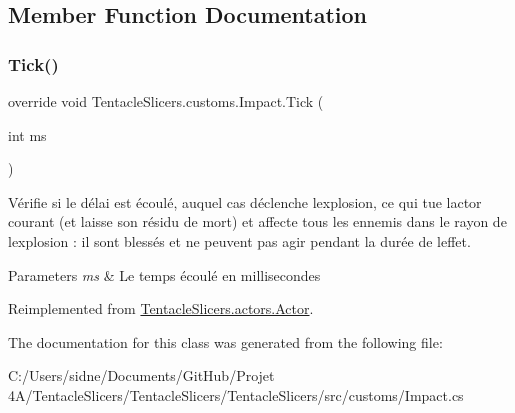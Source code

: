 \subsection{Member Function Documentation}
\mbox{\label{class_tentacle_slicers_1_1customs_1_1_impact_ad9ed6b3562b6063e567638058787fd6f}} 
\subsubsection{\texorpdfstring{Tick()}{Tick()}}
{\footnotesize\ttfamily override void Tentacle\+Slicers.\+customs.\+Impact.\+Tick (\begin{DoxyParamCaption}\item[{int}]{ms }\end{DoxyParamCaption})\hspace{0.3cm}{\ttfamily [virtual]}}



Vérifie si le délai est écoulé, auquel cas déclenche l\textquotesingle{}explosion, ce qui tue l\textquotesingle{}actor courant (et laisse son résidu de mort) et affecte tous les ennemis dans le rayon de l\textquotesingle{}explosion \+: il sont blessés et ne peuvent pas agir pendant la durée de l\textquotesingle{}effet. 


\begin{DoxyParams}{Parameters}
{\em ms} & Le temps écoulé en millisecondes \\
\hline
\end{DoxyParams}


Reimplemented from \hyperlink{class_tentacle_slicers_1_1actors_1_1_actor_a13e48a1ca022ce7c971c77f1354e3daf}{Tentacle\+Slicers.\+actors.\+Actor}.



The documentation for this class was generated from the following file\+:\begin{DoxyCompactItemize}
\item 
C\+:/\+Users/sidne/\+Documents/\+Git\+Hub/\+Projet 4\+A/\+Tentacle\+Slicers/\+Tentacle\+Slicers/\+Tentacle\+Slicers/src/customs/Impact.\+cs\end{DoxyCompactItemize}
